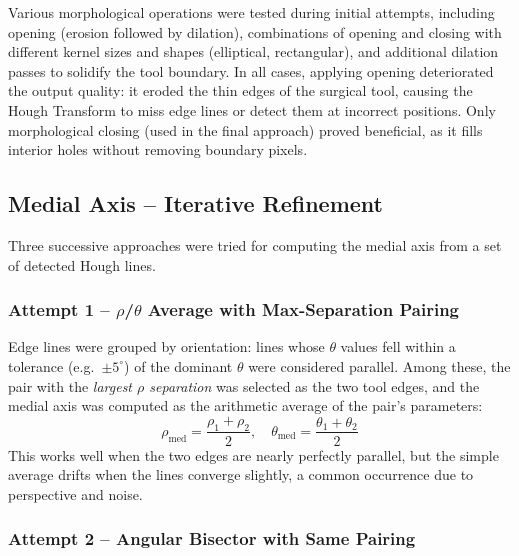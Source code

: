 \documentclass[conference, twocolumn]{IEEEtran}
\begin{document}
Various morphological operations were tested during initial attempts, including opening (erosion followed by dilation), combinations of opening and closing with different kernel sizes and shapes (elliptical, rectangular), and additional dilation passes to solidify the tool boundary. In all cases, applying opening deteriorated the output quality: it eroded the thin edges of the surgical tool, causing the Hough Transform to miss edge lines or detect them at incorrect positions. Only morphological closing (used in the final approach) proved beneficial, as it fills interior holes without removing boundary pixels.

\subsection{Medial Axis -- Iterative Refinement}

Three successive approaches were tried for computing the medial axis from a set of detected Hough lines.

\subsubsection{Attempt 1 -- $\rho$/$\theta$ Average with Max-Separation Pairing}

Edge lines were grouped by orientation: lines whose $\theta$ values fell within a tolerance (e.g.\ $\pm 5^\circ$) of the dominant $\theta$ were considered parallel. Among these, the pair with the \emph{largest $\rho$ separation} was selected as the two tool edges, and the medial axis was computed as the arithmetic average of the pair's parameters:
\begin{equation}
    \rho_{\text{med}} = \frac{\rho_1 + \rho_2}{2}, \quad \theta_{\text{med}} = \frac{\theta_1 + \theta_2}{2}
\end{equation}
This works well when the two edges are nearly perfectly parallel, but the simple average drifts when the lines converge slightly, a common occurrence due to perspective and noise.

\subsubsection{Attempt 2 -- Angular Bisector with Same Pairing}
\end{document}
